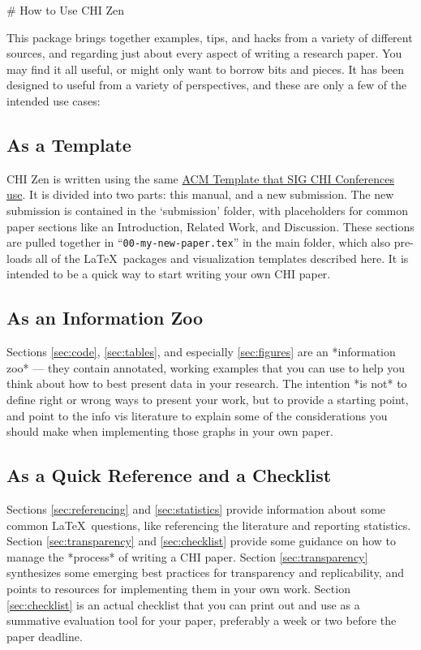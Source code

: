 \begin{markdown}
# How to Use CHI Zen

This package brings together examples, tips, and hacks from a variety of different sources, and regarding just about every aspect of writing a research paper. You may find it all useful, or might only want to borrow bits and pieces. It has been designed to useful from a variety of perspectives, and these are only a few of the intended use cases:  

\subsection*{As a Template}

CHI Zen is written using the same \href{https://www.acm.org/publications/authors/submissions}{ACM Template that SIG CHI Conferences use}. It is divided into two parts: this manual, and a new submission. The new submission is contained in the `submission' folder, with placeholders for common paper sections like an Introduction, Related Work, and Discussion. These sections are pulled together in ``\texttt{00-my-new-paper.tex}'' in the main folder, which also pre-loads all of the \LaTeX\ packages and visualization templates described here. It is intended to be a quick way to start writing your own CHI paper.

\subsection*{As an Information Zoo}

Sections \ref{sec:code}, \ref{sec:tables}, and especially \ref{sec:figures} are an *information zoo* --- they contain annotated, working examples that you can use to help you think about how to best present data in your research. The intention *is not* to define right or wrong ways to present your work, but to provide a starting point, and point to the info vis literature to explain some of the considerations you should make when implementing those graphs in your own paper.


\subsection*{As a Quick Reference and a Checklist}

Sections \ref{sec:referencing} and \ref{sec:statistics} provide information about some common \LaTeX\ questions, like referencing the literature and reporting statistics. Section \ref{sec:transparency} and \autoref{sec:checklist} provide some guidance on how to manage the *process* of writing a CHI paper. Section \ref{sec:transparency} synthesizes some emerging best practices for transparency and replicability, and points to resources for implementing them in your own work. Section \ref{sec:checklist} is an actual checklist that you can print out and use as a summative evaluation tool for your paper, preferably a week or two before the paper deadline. 



\end{markdown}
